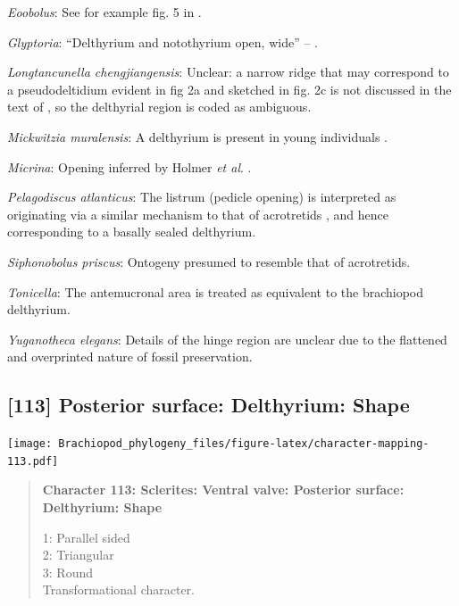 \documentclass[openany]{book}
\begin{document}
\hypertarget{Eoobolus-coding-112}{}
\emph{Eoobolus}: See for example fig. 5 in
\citet{Balthasar2009Thebrachiopod}.

\hypertarget{Glyptoria-coding-112}{}
\emph{Glyptoria}: ``Delthyrium and notothyrium open, wide'' --
\citet{Cooper1976LowerCambrian}.

\hypertarget{Longtancunella_chengjiangensis-coding-112}{}
\emph{Longtancunella chengjiangensis}: Unclear: a narrow ridge that may
correspond to a pseudodeltidium evident in fig 2a and sketched in fig.
2c is not discussed in the text of \citet{Zhang2011Theexceptionally}, so
the delthyrial region is coded as ambiguous.

\hypertarget{Mickwitzia_muralensis-coding-112}{}
\emph{Mickwitzia muralensis}: A delthyrium is present in young
individuals \citep{Balthasar2004Shellstructure}.

\hypertarget{Micrina-coding-112}{}
\emph{Micrina}: Opening inferred by Holmer \emph{et al}.
\citeyearpar{Holmer2008TheEarly}.

\hypertarget{Pelagodiscus_atlanticus-coding-112}{}
\emph{Pelagodiscus atlanticus}: The listrum (pedicle opening) is
interpreted as originating via a similar mechanism to that of
acrotretids \citep{Popov1992TheCambrian}, and hence corresponding to a
basally sealed delthyrium.

\hypertarget{Siphonobolus_priscus-coding-112}{}
\emph{Siphonobolus priscus}: Ontogeny presumed to resemble that of
acrotretids.

\hypertarget{Tonicella-coding-112}{}
\emph{Tonicella}: The antemucronal area \citep{Schwabe2010} is treated
as equivalent to the brachiopod delthyrium.

\hypertarget{Yuganotheca_elegans-coding-112}{}
\emph{Yuganotheca elegans}: Details of the hinge region are unclear due
to the flattened and overprinted nature of fossil preservation.

\subsection*{{[}113{]} Posterior surface: Delthyrium:
Shape}\label{posterior-surface-delthyrium-shape}

\texttt{[image: Brachiopod\_phylogeny\_files/figure-latex/character-mapping-113.pdf]}

\begin{quote}
\textbf{Character 113: Sclerites: Ventral valve: Posterior surface:
Delthyrium: Shape}

1: Parallel sided\\
2: Triangular\\
3: Round\\
Transformational character.
\end{quote}
\end{document}
